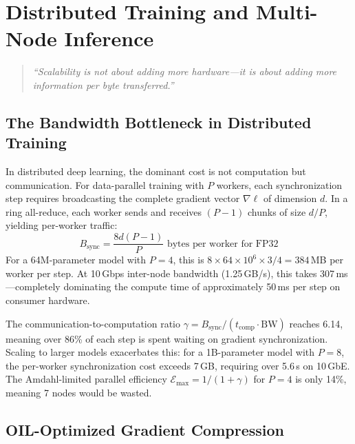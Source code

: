 
\chapter{Distributed Training and Multi-Node Inference}
\label{ch:distributed}

\begin{quote}
\textit{``Scalability is not about adding more hardware---it is about adding more information per byte transferred.''}
\end{quote}

\section{The Bandwidth Bottleneck in Distributed Training}
\label{sec:dist_bandwidth}

In distributed deep learning, the dominant cost is not computation but communication. For data-parallel training with $P$ workers, each synchronization step requires broadcasting the complete gradient vector $\nabla \ell$ of dimension $d$. In a ring all-reduce, each worker sends and receives $(P-1)$ chunks of size $d/P$, yielding per-worker traffic:
\[
B_{\text{sync}} = \frac{8d(P-1)}{P} \text{ bytes per worker for FP32}
\]
For a 64M-parameter model with $P = 4$, this is $8 \times 64 \times 10^6 \times 3 / 4 = 384$\,MB per worker per step. At 10\,Gbps inter-node bandwidth (1.25\,GB/s), this takes 307\,ms---completely dominating the compute time of approximately 50\,ms per step on consumer hardware.

The communication-to-computation ratio $\gamma = B_{\text{sync}} / (t_{\text{comp}} \cdot \text{BW})$ reaches 6.14, meaning over 86\% of each step is spent waiting on gradient synchronization. Scaling to larger models exacerbates this: for a 1B-parameter model with $P = 8$, the per-worker synchronization cost exceeds 7\,GB, requiring over 5.6\,s on 10\,GbE. The Amdahl-limited parallel efficiency $\mathcal{E}_{\text{max}} = 1/(1+\gamma)$ for $P = 4$ is only 14\%, meaning 7 nodes would be wasted.

\section{OIL-Optimized Gradient Compression}
\label{sec:oil_gradient_compression}

